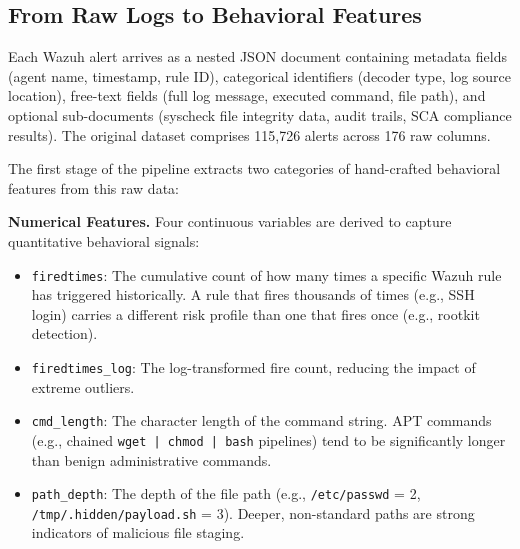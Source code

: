 \subsection{From Raw Logs to Behavioral Features}
\label{subsec:raw_to_features}

Each Wazuh alert arrives as a nested JSON document containing metadata fields (agent name, timestamp, rule ID), categorical identifiers (decoder type, log source location), free-text fields (full log message, executed command, file path), and optional sub-documents (syscheck file integrity data, audit trails, SCA compliance results). The original dataset comprises 115,726 alerts across 176 raw columns.

The first stage of the pipeline extracts two categories of hand-crafted behavioral features from this raw data:

\textbf{Numerical Features.} Four continuous variables are derived to capture quantitative behavioral signals:
\begin{itemize}
    \item \texttt{firedtimes}: The cumulative count of how many times a specific Wazuh rule has triggered historically. A rule that fires thousands of times (e.g., SSH login) carries a different risk profile than one that fires once (e.g., rootkit detection).
    \item \texttt{firedtimes\_log}: The log-transformed fire count, reducing the impact of extreme outliers.
    \item \texttt{cmd\_length}: The character length of the command string. APT commands (e.g., chained \texttt{wget | chmod | bash} pipelines) tend to be significantly longer than benign administrative commands.
    \item \texttt{path\_depth}: The depth of the file path (e.g., \texttt{/etc/passwd} = 2, \texttt{/tmp/.hidden/payload.sh} = 3). Deeper, non-standard paths are strong indicators of malicious file staging.
\end{itemize}

